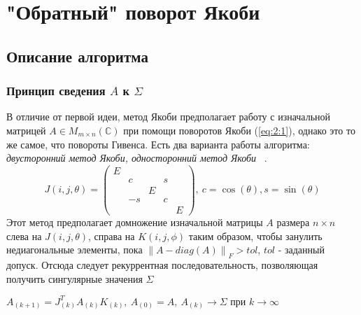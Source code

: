 \newpage
\section{"Обратный" поворот Якоби}

\subsection{Описание алгоритма}

\subsubsection{Принцип сведения $A$ к $\Sigma$}
В отличие от первой идеи, метод Якоби предполагает работу с изначальной матрицей $A\in M_{m\times n}(\mathbb{C})$ при помощи поворотов Якоби (\ref{eq:2:1}), однако это то же самое, что повороты Гивенса. Есть два варианта работы алгоритма:\textit{ двусторонний метод Якоби, односторонний метод Якоби} ~\cite{Dongarra2018}.
\begin{equation} \label{eq:2:1}
    J(i,j,\theta) = 
    \begin{pmatrix}E&&&&\\
        &c&&s\\
        &&E&&\\
        &-s&&c\\
        &&&&E
    \end{pmatrix},\
    c = \cos(\theta), s =\sin(\theta) 
\end{equation}
Этот метод предполагает домножение изначальной матрицы $A$ размера $n\times n \ $ слева на $J(i,j,\theta)$, справа на $K(i,j,\phi)$ таким образом, чтобы занулить недиагональные элементы, пока $\left\| A - diag(A) \right\|_F > tol$, $tol$ - заданный допуск. 
Отсюда следует рекуррентная последовательность, позволяющая получить сингулярные значения $\Sigma$
\begin{center}
    $A_{(k+1)} = J^T_{(k)}A_{(k)}K_{(k)}, \ A_{(0)}= A, \ A_{(k)}\longrightarrow\Sigma \text{ при } k\to\infty$
\end{center}

